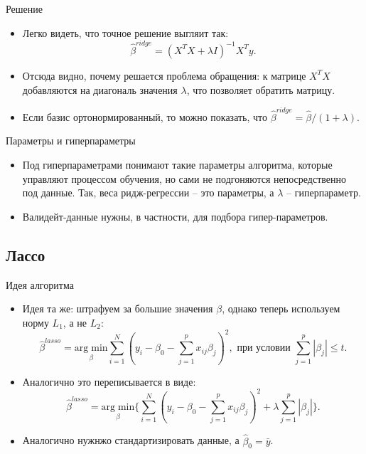 \documentclass[9pt]{beamer}
\begin{document}
\begin{frame}{Решение}
\begin{itemize}
    \item Легко видеть, что точное решение выгляит так:
    $$\hat\beta^{ridge} = (X^TX + \lambda I)^{-1}X^Ty.$$
    \item Отсюда видно, почему решается проблема обращения: к матрице $X^TX$ добавляются на диагональ значения $\lambda$, что позволяет обратить матрицу.
    \item Если базис ортонормированный, то можно показать, что $\hat\beta^{ridge} = \hat\beta/(1+\lambda)$.
\end{itemize}
\end{frame}

\begin{frame}{Параметры и гиперпараметры}
    \begin{itemize}
        \item Под гиперпараметрами понимают такие параметры алгоритма, которые управляют процессом обучения, но сами не подгоняются непосредственно под данные. Так, веса ридж-регрессии -- это параметры, а $\lambda$ -- гиперпараметр.
        \item Валидейт-данные нужны, в частности, для подбора гипер-параметров.
    \end{itemize}
\end{frame}

\subsection{Лассо}
\begin{frame}{Идея алгоритма}
    \begin{itemize}
        \item Идея та же: штрафуем за большие значения $\beta$, однако теперь используем норму $L_1$, а не $L_2$:
        $$\hat\beta^{lasso} = \underset{\beta}{\mathrm{arg\;min}} \sum_{i=1}^N \left(y_i -\beta_0 - \sum_{j=1}^p x_{ij}\beta_j\right)^2, \text{ при условии } \sum_{j=1}^p|\beta_j| \leq t.$$
        \item Аналогично это переписывается в виде:
        $$\hat\beta^{lasso} = \underset{\beta}{\mathrm{arg\;min}} \bigg\{ \sum_{i=1}^N \left(y_i -\beta_0 - \sum_{j=1}^p x_{ij}\beta_j\right)^2 + \lambda\sum_{j=1}^p|\beta_j| \bigg\}.$$
        \item Аналогично нужнжо стандартизировать данные, а $\hat \beta_0 = \bar y$.
    \end{itemize}
\end{frame}
\end{document}
